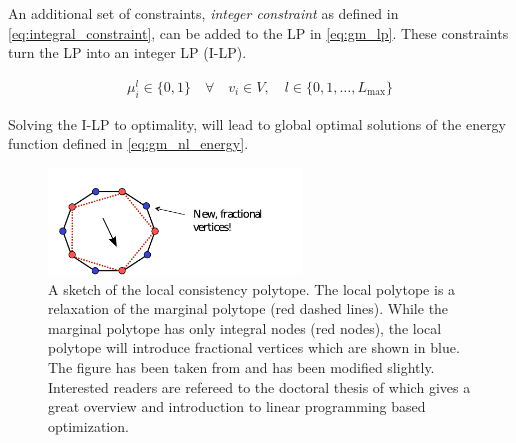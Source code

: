 An additional set of constraints, \emph{integer constraint} as defined in \cref{eq:integral_constraint}, can be added to the LP in \cref{eq:gm_lp}. These constraints turn the LP into an integer LP (I-LP).

\begin{align}
    \mu_i^l \in \{0,1\} \quad \forall \quad v_{i} \in V,
    \quad l \in \{ 0,1,\ldots,L_{\text{max}} \} \label{eq:integral_constraint}
\end{align}

Solving the I-LP to optimality, will lead to 
global optimal solutions of the energy function defined in 
\cref{eq:gm_nl_energy}.







\begin{figure}[H]
\centering
\includegraphics[width=0.6\textwidth]{fig/frac_vert2.pdf}
\caption{
    A sketch of the local consistency polytope.
    The local polytope is a relaxation
    of the marginal polytope (red dashed lines).
    While the marginal polytope has only integral
    nodes (red nodes), the local polytope 
    will introduce fractional vertices which are shown
    in blue.
    The figure has been taken from \citep{sontag_2010_thesis}
    and has been modified slightly.
    Interested readers are refereed to the doctoral
    thesis of  \citet{sontag_2010_thesis} which gives
    a great overview and introduction to linear programming
    based optimization.
}\label{fig:local_poly}
\end{figure}





